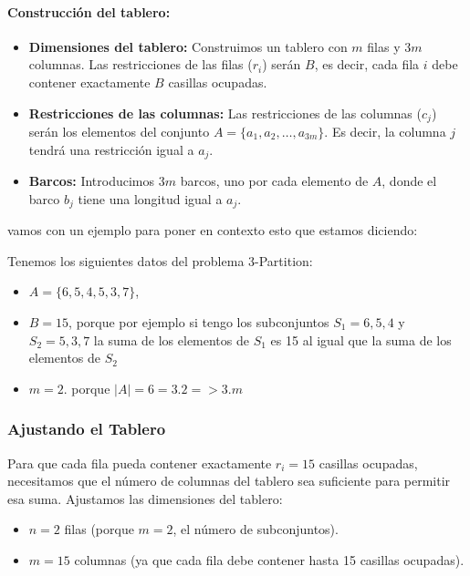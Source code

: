 \paragraph{Construcción del tablero:}
\begin{itemize}
    \item \textbf{Dimensiones del tablero:} Construimos un tablero con \(m\) filas y \(3m\) columnas. Las restricciones de las filas (\(r_i\)) serán \(B\), es decir, cada fila \(i\) debe contener exactamente \(B\) casillas ocupadas.
    \item \textbf{Restricciones de las columnas:} Las restricciones de las columnas (\(c_j\)) serán los elementos del conjunto \(A = \{a_1, a_2, \dots, a_{3m}\}\). Es decir, la columna \(j\) tendrá una restricción igual a \(a_j\).
    \item \textbf{Barcos:} Introducimos \(3m\) barcos, uno por cada elemento de \(A\), donde el barco \(b_j\) tiene una longitud igual a \(a_j\).
\end{itemize}

vamos con un ejemplo para poner en contexto esto que estamos diciendo:

\vskip0.5cm
Tenemos los siguientes datos del problema 3-Partition: 

\begin{itemize}
    \item $A = \{6, 5, 4, 5, 3, 7\}$,
    \item $B = 15$, porque por ejemplo si tengo los subconjuntos $S_{1}={6,5,4}$ y $S_{2}={5,3,7}$ la suma de los elementos de $S_{1}$ es 15 al igual que la suma de los elementos de $S_{2}$ 
    \item $m = 2$. porque $|A| = 6 = 3.2 => 3.m$
\end{itemize}

\subsubsection*{Ajustando el Tablero}

Para que cada fila pueda contener exactamente $r_i = 15$ casillas ocupadas, necesitamos que el número de columnas del tablero sea suficiente para permitir esa suma. Ajustamos las dimensiones del tablero:

\begin{itemize}
    \item $n = 2$ filas (porque $m = 2$, el número de subconjuntos).
    \item $m = 15$ columnas (ya que cada fila debe contener hasta 15 casillas ocupadas).
\end{itemize}

